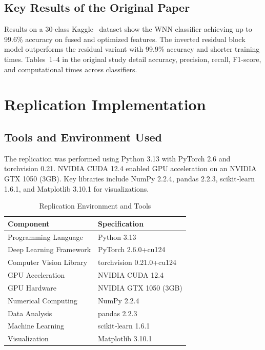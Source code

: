 \documentclass[journal,onecolumn]{IEEEtran}
\begin{document}
\subsection{Key Results of the Original Paper}
Results on a 30-class Kaggle~\cite{KaggleDataset} dataset show the WNN classifier achieving up to 99.6\% accuracy on fused and optimized features. The inverted residual block model outperforms the residual variant with 99.9\% accuracy and shorter training times. Tables~1--4 in the original study detail accuracy, precision, recall, F1-score, and computational times across classifiers.


\section{Replication Implementation}
\subsection{Tools and Environment Used}
The replication was performed using Python 3.13 with PyTorch 2.6 and torchvision 0.21. NVIDIA CUDA 12.4 enabled GPU acceleration on an NVIDIA GTX 1050 (3GB). Key libraries include NumPy 2.2.4, pandas 2.2.3, scikit\textit{‑}learn 1.6.1, and Matplotlib 3.10.1 for visualizations.
\begin{table}[H]
  \centering
  \caption{Replication Environment and Tools}
  \label{tab:environment}
  \begin{tabular}{ll}
    \hline
    \textbf{Component} & \textbf{Specification} \\
    \hline
    Programming Language & Python 3.13 \\
    Deep Learning Framework & PyTorch 2.6.0+cu124 \\
    Computer Vision Library & torchvision 0.21.0+cu124 \\
    GPU Acceleration & NVIDIA CUDA 12.4 \\
    GPU Hardware & NVIDIA GTX 1050 (3GB) \\
    Numerical Computing & NumPy 2.2.4 \\
    Data Analysis & pandas 2.2.3 \\
    Machine Learning & scikit\textit{-}learn 1.6.1 \\
    Visualization & Matplotlib 3.10.1 \\
    \hline
  \end{tabular}
\end{table}
\end{document}
